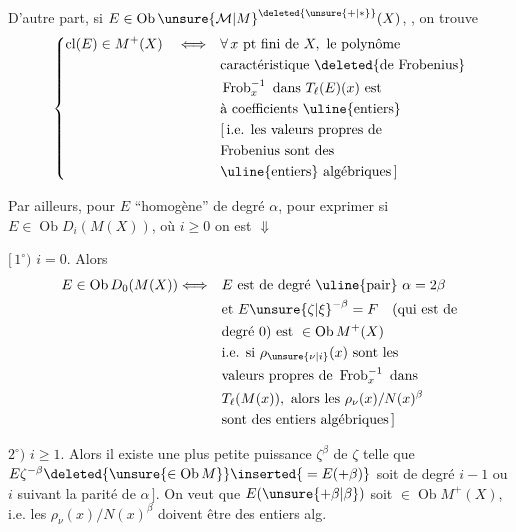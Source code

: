 D'autre part, si $E\in\operatorname{Ob}\unsure{\mathcal M|M}^{\deleted{\unsure{+|\ast}}}(X)$, , on trouve
\[
\left\{\begin{aligned}
\operatorname{cl}(E)\in M^+(X)\quad\Longleftrightarrow\quad
&\forall\,x\ \text{pt fini de }X,\ \text{le polynôme}\\
&\text{caractéristique }\deleted{\text{de Frobenius}}\\
&\operatorname{Frob}_x^{-1}\ \text{dans }T_\ell(E)(x)\text{ est}\\
&\text{à coefficients }\text{\uline{entiers}}\\
&[\,\text{i.e. les valeurs propres de}\\
&\text{Frobenius sont des}\\
&\text{\uline{entiers} algébriques}\,]
\end{aligned}\right.
\]

Par ailleurs, pour  $E$ ``homogène'' de degré $\alpha$, pour exprimer si $E\in\operatorname{Ob}D_i(M(X))$, où $i\geq 0$ 
 on est $\Downarrow$

$[\,1^\circ)$ $i=0$. Alors
\[
\begin{aligned}
E\in\operatorname{Ob}D_0(M(X))\Longleftrightarrow\quad &E\text{ est de degré \uline{pair} }\alpha=2\beta\\
&\text{et }E\unsure{\zeta|\xi}^{-\beta}=F\quad(\text{qui est de}\\
&\text{degré }0)\text{ est }\in\operatorname{Ob}M^+(X)\\
&\text{i.e. si }\rho_{\unsure{\nu|i}}(x)\text{ sont les}\\
&\text{valeurs propres de }\operatorname{Frob}_x^{-1}\text{ dans}\\
&T_\ell(M(x)),\ \text{alors les }\rho_\nu(x)/N(x)^\beta\\
&\text{sont des entiers algébriques}\,]
\end{aligned}
\]

$2^\circ)$ $i\geq 1$. Alors il existe une plus petite puissance $\zeta^\beta$ de $\zeta$ telle que $E\zeta^{-\beta}\deleted{\unsure{\in\operatorname{Ob} M}}\inserted{{}=E(+\beta)}$ soit de degré $i-1$ ou $i$ \unsure{[|(}suivant la parité de $\alpha\,]$. On veut que  $E(\unsure{+\beta|\beta})$ soit $\in\operatorname{Ob} M^+(X)$, i.e. les $\rho_\nu(x)/N(x)^\beta$ doivent être des entiers alg.


